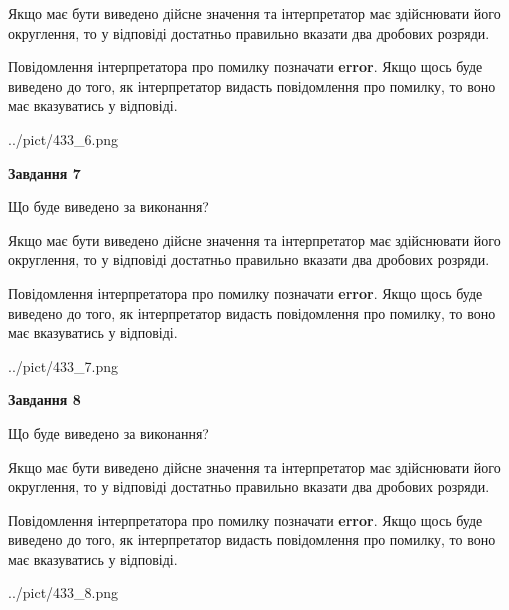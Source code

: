 \documentclass[12pt, ukrainian]{article}
\begin{document}
{\begin {Large}
Якщо має бути виведено дійсне значення та інтерпретатор має здійснювати його округлення, 
то у відповіді достатньо правильно вказати два дробових розряди.

Повідомлення інтерпретатора про помилку позначати \textbf{error}.
Якщо щось буде виведено до того, як інтерпретатор видасть повідомлення про помилку, 
то воно має вказуватись у відповіді. \par

\begin{center}
	{../pict/433_6.png}
\end{center}
\newpage

{\begin {center}\textbf{Завдання 7}\end {center}}\par
Що буде виведено за виконання? \par

Якщо має бути виведено дійсне значення та інтерпретатор має здійснювати його округлення, 
то у відповіді достатньо правильно вказати два дробових розряди.

Повідомлення інтерпретатора про помилку позначати \textbf{error}.
Якщо щось буде виведено до того, як інтерпретатор видасть повідомлення про помилку, 
то воно має вказуватись у відповіді. \par

\begin{center}
	{../pict/433_7.png}
\end{center}
\newpage

{\begin {center}\textbf{Завдання 8}\end {center}}\par
Що буде виведено за виконання? \par

Якщо має бути виведено дійсне значення та інтерпретатор має здійснювати його округлення, 
то у відповіді достатньо правильно вказати два дробових розряди.

Повідомлення інтерпретатора про помилку позначати \textbf{error}.
Якщо щось буде виведено до того, як інтерпретатор видасть повідомлення про помилку, 
то воно має вказуватись у відповіді. \par

\begin{center}
	{../pict/433_8.png}
\end{center}
\newpage


\end{Large}}
\end{document}
